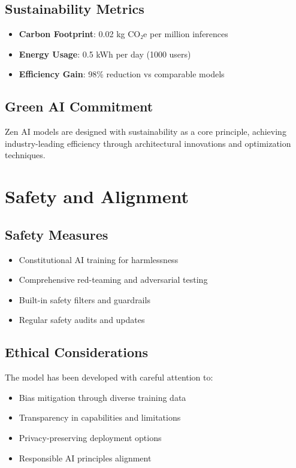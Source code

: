 \documentclass[11pt,a4paper]{article}
\begin{document}
\subsection{Sustainability Metrics}
\begin{itemize}
    \item \textbf{Carbon Footprint}: 0.02 kg CO₂e per million inferences
    \item \textbf{Energy Usage}: 0.5 kWh per day (1000 users)
    \item \textbf{Efficiency Gain}: 98\% reduction vs comparable models
\end{itemize}

\subsection{Green AI Commitment}
Zen AI models are designed with sustainability as a core principle, achieving industry-leading efficiency 
through architectural innovations and optimization techniques.

\section{Safety and Alignment}

\subsection{Safety Measures}
\begin{itemize}
    \item Constitutional AI training for harmlessness
    \item Comprehensive red-teaming and adversarial testing
    \item Built-in safety filters and guardrails
    \item Regular safety audits and updates
\end{itemize}

\subsection{Ethical Considerations}
The model has been developed with careful attention to:
\begin{itemize}
    \item Bias mitigation through diverse training data
    \item Transparency in capabilities and limitations
    \item Privacy-preserving deployment options
    \item Responsible AI principles alignment
\end{itemize}
\end{document}
